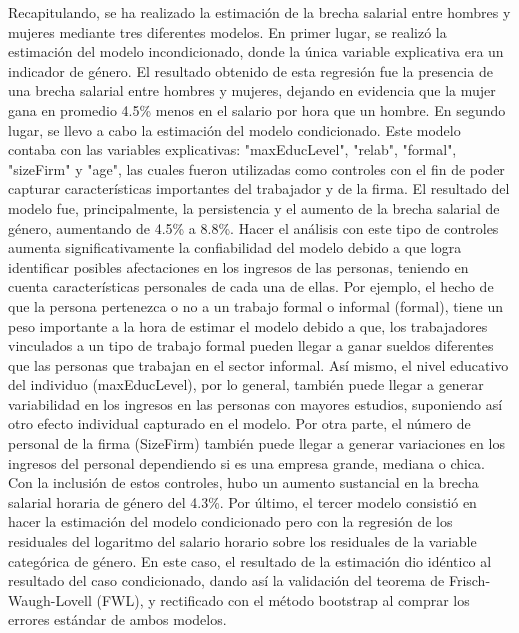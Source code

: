 \documentclass[10pt]{article}
\begin{document}
Recapitulando, se ha realizado la estimación de la brecha salarial entre hombres y mujeres mediante tres diferentes modelos. En primer lugar, se realizó la estimación del modelo incondicionado, donde la única variable explicativa era un indicador de género. El resultado obtenido de esta regresión fue la presencia de una brecha salarial entre hombres y mujeres, dejando en evidencia que la mujer gana en promedio 4.5\% menos en el salario por hora que un hombre. 
En segundo lugar, se llevo a cabo la estimación del modelo condicionado. Este modelo contaba con las variables explicativas: "maxEducLevel", "relab", "formal", "sizeFirm" y "age", las cuales fueron utilizadas como controles con el fin de poder capturar características importantes del trabajador y de la firma. El resultado del modelo fue, principalmente, la persistencia y el aumento de la brecha salarial de género, aumentando de 4.5\% a 8.8\%. Hacer el análisis con este tipo de controles aumenta significativamente la confiabilidad del modelo debido a que logra identificar posibles afectaciones en los ingresos de las personas, teniendo en cuenta características personales de cada una de ellas. Por ejemplo, el hecho de que la persona pertenezca o no a un trabajo formal o informal (formal), tiene un peso importante a la hora de estimar el modelo debido a que, los trabajadores vinculados a un tipo de trabajo formal pueden llegar a ganar sueldos diferentes que las personas que trabajan en el sector informal. Así mismo, el nivel educativo del individuo (maxEducLevel), por lo general, también puede llegar a generar variabilidad en los ingresos en las personas con mayores estudios, suponiendo así otro efecto individual capturado en el modelo. Por otra parte, el número de personal de la firma (SizeFirm) también puede llegar a generar variaciones en los ingresos del personal dependiendo si es una empresa grande, mediana o chica. Con la inclusión de estos controles, hubo un aumento sustancial en la brecha salarial horaria de género del 4.3\%.
Por último, el tercer modelo consistió en hacer la estimación del modelo condicionado pero con la regresión de los residuales del logaritmo del salario horario sobre los residuales de la variable categórica de género. En este caso, el resultado de la estimación dio idéntico al resultado del caso condicionado, dando así la validación del teorema de Frisch-Waugh-Lovell (FWL), y rectificado con el método bootstrap al comprar los errores estándar de ambos modelos. 
\end{document}
